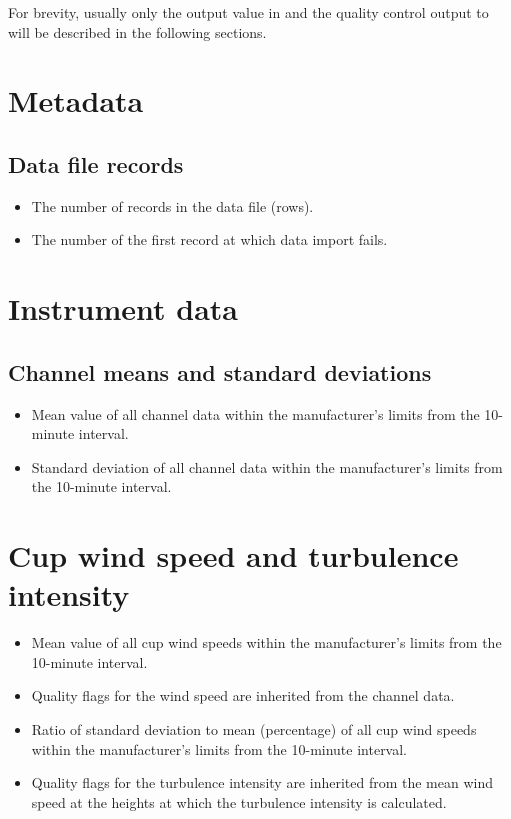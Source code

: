 For brevity, usually only the output value in  and the quality control output to  will be described in the following sections.

\section{Metadata}
\subsection{Data file records}
\begin{itemize}
\item {} The number of records in the data file (rows). 
\item {} The number of the first record at which data import fails.
\end{itemize}

\section{Instrument data}
\subsection{Channel means and standard deviations}
\begin{itemize}
\item {} Mean value of all channel data within the manufacturer's limits from the 10-minute interval. 
\item {} Standard deviation of all channel data within the manufacturer's limits from the 10-minute interval.
\end{itemize}

\section{Cup wind speed and turbulence intensity}
\begin{itemize}
\item {} Mean value of all cup wind speeds within the manufacturer's limits from the 10-minute interval. 
\item {} Quality flags for the wind speed are inherited from the channel data.
\item {} Ratio of standard deviation to mean (percentage) of all cup wind speeds within the manufacturer's limits from the 10-minute interval.
\item {} Quality flags for the turbulence intensity are inherited from the mean wind speed at the heights at which the turbulence intensity is calculated.
\end{itemize}

